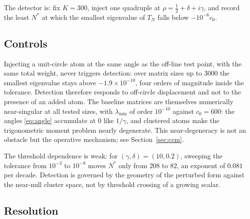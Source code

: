 \documentclass[11pt,oneside]{article}
\theoremstyle{remark}
\begin{document}
The detector is: fix $K = 300$, inject one quadruple at
$\rho = \tfrac12 + \delta + i\gamma$, and record the least $N^{*}$ at which the
smallest eigenvalue of $T_{N}$ falls below $-10^{-6} c_0$.

\subsection{Controls}

Injecting a unit-circle atom at the same angle as the off-line test point, with
the same total weight, never triggers detection: over matrix sizes up to
$3000$ the smallest eigenvalue stays above $-1.9\times10^{-10}$, four orders of
magnitude inside the tolerance. Detection therefore responds to off-circle
displacement and not to the presence of an added atom. The baseline matrices
are themselves numerically near-singular at all tested sizes, with
$\lambda_{\min}$ of order $10^{-10}$ against $c_0 = 600$: the angles
\eqref{eq:angle} accumulate at $0$ like $1/\gamma$, and clustered atoms make
the trigonometric moment problem nearly degenerate. This near-degeneracy is not
an obstacle but the operative mechanism; see Section~\ref{sec:ccm}.

The threshold dependence is weak: for $(\gamma,\delta) = (10, 0.2)$, sweeping
the tolerance from $10^{-3}$ to $10^{-8}$ moves $N^{*}$ only from $208$ to
$82$, an exponent of $0.081$ per decade. Detection is governed by the geometry
of the perturbed form against the near-null cluster space, not by
threshold crossing of a growing scalar.

\subsection{Resolution}
\end{document}
